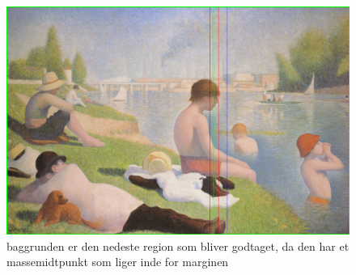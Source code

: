 \begin{figure}[h!!]
	\begin{center}
		\includegraphics[scale=0.3,angle=0]{afsnit/afprovning/billeder/udvidet_losning/udvidet_dreng.png}
	\end{center}
	\caption[]{baggrunden er den nedeste region som bliver godtaget, da den har et massemidtpunkt som liger inde for marginen}
	\label{udvidet_virker2}
\end{figure}

